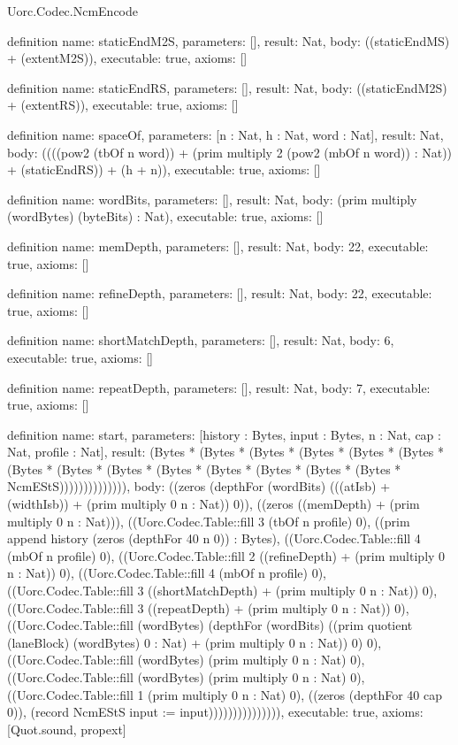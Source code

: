 \begin{lexlean}{Uorc.Codec.NcmEncode}
\begin{semanticmodule}
definition{
  name: staticEndM2S,
  parameters: [],
  result: Nat,
  body: ((staticEndMS) + (extentM2S)),
  executable: true,
  axioms: []
}

definition{
  name: staticEndRS,
  parameters: [],
  result: Nat,
  body: ((staticEndM2S) + (extentRS)),
  executable: true,
  axioms: []
}

definition{
  name: spaceOf,
  parameters: [n : Nat, h : Nat, word : Nat],
  result: Nat,
  body: ((((pow2 (tbOf n word)) + (prim multiply 2 (pow2 (mbOf n word)) : Nat)) + (staticEndRS)) + (h + n)),
  executable: true,
  axioms: []
}

definition{
  name: wordBits,
  parameters: [],
  result: Nat,
  body: (prim multiply (wordBytes) (byteBits) : Nat),
  executable: true,
  axioms: []
}

definition{
  name: memDepth,
  parameters: [],
  result: Nat,
  body: 22,
  executable: true,
  axioms: []
}

definition{
  name: refineDepth,
  parameters: [],
  result: Nat,
  body: 22,
  executable: true,
  axioms: []
}

definition{
  name: shortMatchDepth,
  parameters: [],
  result: Nat,
  body: 6,
  executable: true,
  axioms: []
}

definition{
  name: repeatDepth,
  parameters: [],
  result: Nat,
  body: 7,
  executable: true,
  axioms: []
}

definition{
  name: start,
  parameters: [history : Bytes, input : Bytes, n : Nat, cap : Nat, profile : Nat],
  result: (Bytes * (Bytes * (Bytes * (Bytes * (Bytes * (Bytes * (Bytes * (Bytes * (Bytes * (Bytes * (Bytes * (Bytes * (Bytes * (Bytes * NcmEStS)))))))))))))),
  body: ((zeros (depthFor (wordBits) (((atIsb) + (widthIsb)) + (prim multiply 0 n : Nat)) 0)), ((zeros ((memDepth) + (prim multiply 0 n : Nat))), ((Uorc.Codec.Table::fill 3 (tbOf n profile) 0), ((prim append history (zeros (depthFor 40 n 0)) : Bytes), ((Uorc.Codec.Table::fill 4 (mbOf n profile) 0), ((Uorc.Codec.Table::fill 2 ((refineDepth) + (prim multiply 0 n : Nat)) 0), ((Uorc.Codec.Table::fill 4 (mbOf n profile) 0), ((Uorc.Codec.Table::fill 3 ((shortMatchDepth) + (prim multiply 0 n : Nat)) 0), ((Uorc.Codec.Table::fill 3 ((repeatDepth) + (prim multiply 0 n : Nat)) 0), ((Uorc.Codec.Table::fill (wordBytes) (depthFor (wordBits) ((prim quotient (laneBlock) (wordBytes) 0 : Nat) + (prim multiply 0 n : Nat)) 0) 0), ((Uorc.Codec.Table::fill (wordBytes) (prim multiply 0 n : Nat) 0), ((Uorc.Codec.Table::fill (wordBytes) (prim multiply 0 n : Nat) 0), ((Uorc.Codec.Table::fill 1 (prim multiply 0 n : Nat) 0), ((zeros (depthFor 40 cap 0)), (record NcmEStS {input := input}))))))))))))))),
  executable: true,
  axioms: [Quot.sound, propext]
}


\end{semanticmodule}
\end{lexlean}
